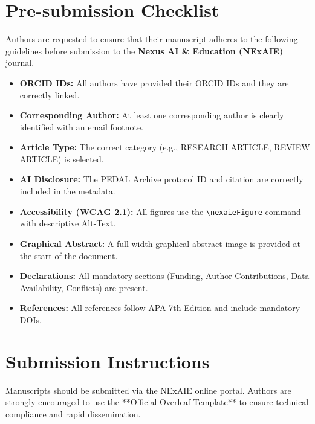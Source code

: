 \documentclass{nexaie}
\author[1]{NExAIE Editorial Office}
\affil[1]{Nexus AI \& Education}
\begin{document}
\maketitle

\section*{Pre-submission Checklist}

Authors are requested to ensure that their manuscript adheres to the following guidelines before submission to the \textbf{Nexus AI \& Education (NExAIE)} journal.

\begin{itemize}[label=$\square$]
    \item \textbf{ORCID IDs:} All authors have provided their ORCID IDs and they are correctly linked.
    \item \textbf{Corresponding Author:} At least one corresponding author is clearly identified with an email footnote.
    \item \textbf{Article Type:} The correct category (e.g., RESEARCH ARTICLE, REVIEW ARTICLE) is selected.
    \item \textbf{AI Disclosure:} The PEDAL Archive protocol ID and citation are correctly included in the metadata.
    \item \textbf{Accessibility (WCAG 2.1):} All figures use the \texttt{\textbackslash nexaieFigure} command with descriptive Alt-Text.
    \item \textbf{Graphical Abstract:} A full-width graphical abstract image is provided at the start of the document.
    \item \textbf{Declarations:} All mandatory sections (Funding, Author Contributions, Data Availability, Conflicts) are present.
    \item \textbf{References:} All references follow APA 7th Edition and include mandatory DOIs.
\end{itemize}

\section*{Submission Instructions}

Manuscripts should be submitted via the NExAIE online portal. Authors are strongly encouraged to use the **Official Overleaf Template** to ensure technical compliance and rapid dissemination.
\end{document}
